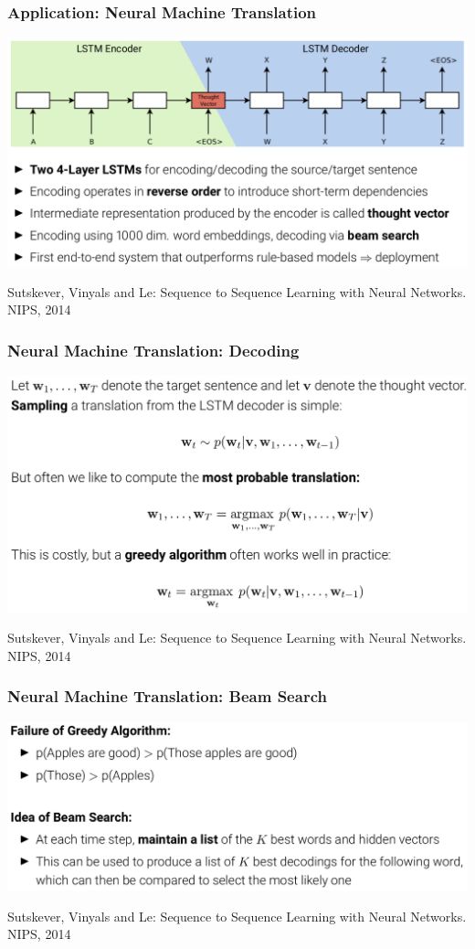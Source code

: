 \documentclass[10pt]{beamer}
\begin{document}
\begin{frame}
  \frametitle{Application: Neural Machine Translation}
\begin{center}
\includegraphics[width=\textwidth]{images/sa}
\end{center}
\scriptsize{Sutskever, Vinyals and Le: Sequence to Sequence Learning with Neural Networks. NIPS, 2014}
\end{frame}


\begin{frame}
  \frametitle{Neural Machine Translation: Decoding}
\begin{center}
\includegraphics[width=\textwidth]{images/sb}
\end{center}
\scriptsize{Sutskever, Vinyals and Le: Sequence to Sequence Learning with Neural Networks. NIPS, 2014}
\end{frame}


\begin{frame}
  \frametitle{Neural Machine Translation: Beam Search}
\begin{center}
\includegraphics[width=.95\textwidth]{images/sc}
\end{center}
\vspace{1cm}
\scriptsize{Sutskever, Vinyals and Le: Sequence to Sequence Learning with Neural Networks. NIPS, 2014}
\end{frame}
\end{document}

